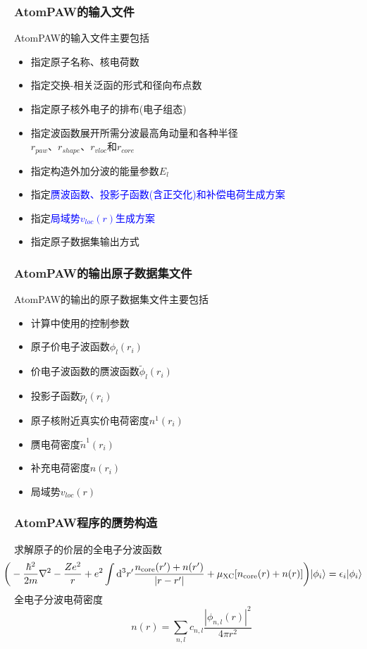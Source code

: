 \frame
{
	\frametitle{\textrm{AtomPAW}的输入文件}
\textrm{AtomPAW}的输入文件主要包括
\begin{itemize}
		\item 指定原子名称、核电荷数
	\item 指定交换-相关泛函的形式和径向布点数
		\item 指定原子核外电子的排布(电子组态)
		\item 指定波函数展开所需分波最高角动量和各种半径\\$r_{paw}$、$r_{shape}$、$r_{vloc}$和$r_{core}$
		\item 指定构造外加分波的能量参数$E_l$
		\item 指定\textcolor{blue}{赝波函数、投影子函数(含正交化)和补偿电荷生成方案}
		\item 指定\textcolor{blue}{局域势$v_{loc}(r)$生成方案}
		\item 指定原子数据集输出方式
	\end{itemize}
}

\frame
{
	\frametitle{\textrm{AtomPAW}的输出原子数据集文件}
	\textrm{AtomPAW}的输出的原子数据集文件主要包括
	\begin{itemize}
		\item 计算中使用的控制参数
		\item 原子价电子波函数$\phi_l(r_i)$
		\item 价电子波函数的赝波函数$\tilde\phi_l(r_i)$
		\item 投影子函数$\tilde p_l(r_i)$
		\item 原子核附近真实价电荷密度$n^1(r_i)$
		\item 赝电荷密度$\tilde n^1(r_i)$
		\item 补充电荷密度$\hat n(r_i)$
		\item 局域势$v_{loc}(r)$
	\end{itemize}
}

\frame
{
	\frametitle{\textrm{AtomPAW}程序的赝势构造}
	求解原子的价层的全电子分波函数
	{\fontsize{9.0pt}{5.2pt}\selectfont$$\hspace*{-17pt}\bigg(-\dfrac{\hbar^2}{2m}\nabla^2-\dfrac{Ze^2}r+e^2\int\mathrm{d}^3r^{\prime}\dfrac{n_{\mathrm{core}}(r^{\prime})+n(r^{\prime})}{|r-r^{\prime}|}+\mu_{\mathrm{XC}}[n_{\mathrm{core}}(r)+n(r)]\bigg)|\phi_i\rangle=\epsilon_i|\phi_i\rangle$$}
	全电子分波电荷密度
	$$n(r)=\sum_{n,l}c_{n,l}\dfrac{|\phi_{n,l}(r)|^2}{4\pi r^2}$$
}

